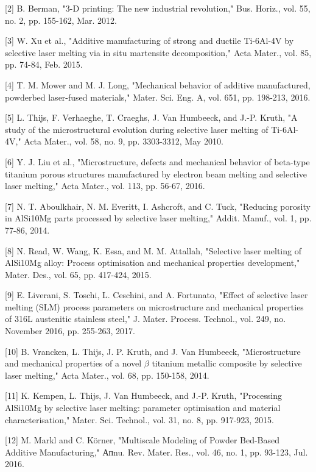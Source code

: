 \documentclass[10pt]{article}
\begin{document}
[2] B. Berman, "3-D printing: The new industrial revolution," Bus. Horiz., vol. 55, no. 2, pp. 155-162, Mar. 2012.

[3] W. Xu et al., "Additive manufacturing of strong and ductile Ti-6Al-4V by selective laser melting via in situ martensite decomposition," Acta Mater., vol. 85, pp. 74-84, Feb. 2015.

[4] T. M. Mower and M. J. Long, "Mechanical behavior of additive manufactured, powderbed laser-fused materials," Mater. Sci. Eng. A, vol. 651, pp. 198-213, 2016.

[5] L. Thijs, F. Verhaeghe, T. Craeghs, J. Van Humbeeck, and J.-P. Kruth, "A study of the microstructural evolution during selective laser melting of Ti-6Al-4V," Acta Mater., vol. 58, no. 9, pp. 3303-3312, May 2010.

[6] Y. J. Liu et al., "Microstructure, defects and mechanical behavior of beta-type titanium porous structures manufactured by electron beam melting and selective laser melting," Acta Mater., vol. 113, pp. 56-67, 2016.

[7] N. T. Aboulkhair, N. M. Everitt, I. Ashcroft, and C. Tuck, "Reducing porosity in AlSi10Mg parts processed by selective laser melting," Addit. Manuf., vol. 1, pp. 77-86, 2014.

[8] N. Read, W. Wang, K. Essa, and M. M. Attallah, "Selective laser melting of AlSi10Mg alloy: Process optimisation and mechanical properties development," Mater. Des., vol. 65, pp. 417-424, 2015.

[9] E. Liverani, S. Toschi, L. Ceschini, and A. Fortunato, "Effect of selective laser melting (SLM) process parameters on microstructure and mechanical properties of 316L austenitic stainless steel," J. Mater. Process. Technol., vol. 249, no. November 2016, pp. 255-263, 2017.

[10] B. Vrancken, L. Thijs, J. P. Kruth, and J. Van Humbeeck, "Microstructure and mechanical properties of a novel $\beta$ titanium metallic composite by selective laser melting," Acta Mater., vol. 68, pp. 150-158, 2014.

[11] K. Kempen, L. Thijs, J. Van Humbeeck, and J.-P. Kruth, "Processing AlSi10Mg by selective laser melting: parameter optimisation and material characterisation," Mater. Sci. Technol., vol. 31, no. 8, pp. 917-923, 2015.

[12] M. Markl and C. Körner, "Multiscale Modeling of Powder Bed-Based Additive Manufacturing," Апnu. Rev. Mater. Res., vol. 46, no. 1, pp. 93-123, Jul. 2016.
\end{document}
